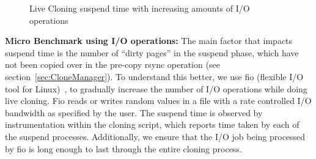 \begin{figure}[ht]
  \centering
\begin{adjustbox}{max size={.49\textwidth}}
  \end{adjustbox}
  \captionsetup{justification=centering}
  \caption{Live Cloning suspend time with increasing amounts of I/O operations }
  \label{fig:fioResults}
\end{figure}


\noindent
\textbf{Micro Benchmark using I/O operations:}
The main factor that impacts suspend time is the number of ``dirty pages'' in the suspend phase, which have not been copied over in the pre-copy rsync operation (see section~\ref{sec:CloneManager}).
To understand this better, we use fio (flexible I/O tool for Linux)~\cite{fio}, to gradually increase the number of I/O operations while doing live cloning.
Fio reads or writes random values in a file with a rate controlled I/O bandwidth as specified by the user. 
The suspend time is observed by instrumentation within the cloning script, which reports time taken by each of the suspend processes.
Additionally, we ensure that the I/O job being processed by fio is long enough to last through the entire cloning process.

